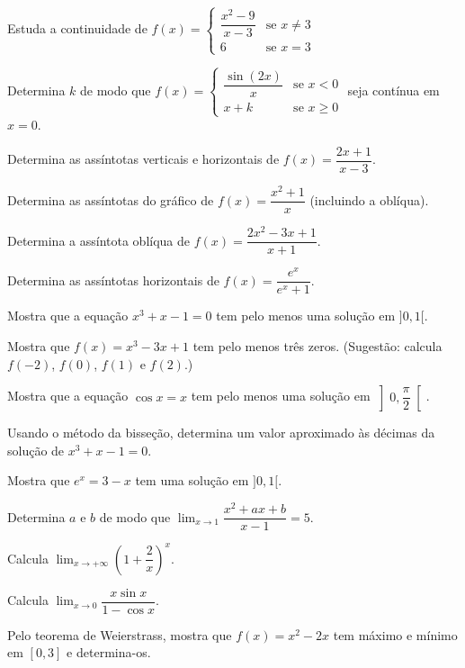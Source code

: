 \documentclass[12pt]{article}
\begin{document}
\begin{exercicios}
  \item Estuda a continuidade de $f(x) = \begin{cases} \dfrac{x^2 - 9}{x - 3} & \text{se } x \neq 3 \\ 6 & \text{se } x = 3 \end{cases}$
  \item Determina $k$ de modo que $f(x) = \begin{cases} \dfrac{\sin(2x)}{x} & \text{se } x < 0 \\ x + k & \text{se } x \ge 0 \end{cases}$ seja contínua em $x = 0$.
  \item Determina as assíntotas verticais e horizontais de $f(x) = \dfrac{2x + 1}{x - 3}$.
  \item Determina as assíntotas do gráfico de $f(x) = \dfrac{x^2 + 1}{x}$ (incluindo a oblíqua).
  \item Determina a assíntota oblíqua de $f(x) = \dfrac{2x^2 - 3x + 1}{x + 1}$.
  \item Determina as assíntotas horizontais de $f(x) = \dfrac{e^x}{e^x + 1}$.
\end{exercicios}

\begin{exercicios}
  \item Mostra que a equação $x^3 + x - 1 = 0$ tem pelo menos uma solução em $]0, 1[$.
  \item Mostra que $f(x) = x^3 - 3x + 1$ tem pelo menos três zeros. (Sugestão: calcula $f(-2)$, $f(0)$, $f(1)$ e $f(2)$.)
  \item Mostra que a equação $\cos x = x$ tem pelo menos uma solução em $\left]0, \dfrac{\pi}{2}\right[$.
  \item Usando o método da bisseção, determina um valor aproximado às décimas da solução de $x^3 + x - 1 = 0$.
  \item Mostra que $e^x = 3 - x$ tem uma solução em $]0, 1[$.
\end{exercicios}

\begin{exercicios}
  \item Determina $a$ e $b$ de modo que $\displaystyle\lim_{x \to 1} \dfrac{x^2 + ax + b}{x - 1} = 5$.
  \item Calcula $\displaystyle\lim_{x \to +\infty} \left(1 + \dfrac{2}{x}\right)^{x}$.
  \item Calcula $\displaystyle\lim_{x \to 0} \dfrac{x \sin x}{1 - \cos x}$.
  \item Pelo teorema de Weierstrass, mostra que $f(x) = x^2 - 2x$ tem máximo e mínimo em $[0, 3]$ e determina-os.
\end{exercicios}
\end{document}
